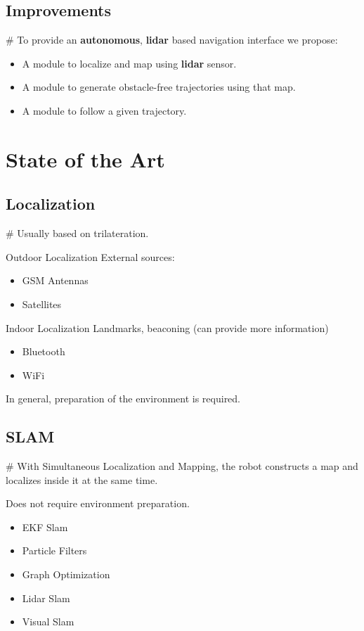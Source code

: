\documentclass[]{beamer}
\def\mAlertSpace{\vspace{0.5em}}
\def\mOrangeItem{\item[\textcolor{orange}{\textbullet}]}
\newcommand{\mSlideTitle}{{{\color{gray}\secname}} \# \subsecname}
\begin{document}
\subsection{Improvements}
\begin{frame}{\mSlideTitle}
  To provide an \textbf{autonomous}, \textbf{lidar} based navigation interface we propose:
  \begin{itemize}
    \mOrangeItem A module to localize and map using \textbf{lidar} sensor.
    \mOrangeItem A module to generate obstacle-free trajectories using that map.
    \mOrangeItem A module to follow a given trajectory.
  \end{itemize}
\end{frame}

\section{State of the Art}
\subsection{Localization}
\begin{frame}{\mSlideTitle}
  Usually based on trilateration.
  \begin{alertblock}{Outdoor Localization}
    \mAlertSpace%
    External sources:
    \begin{itemize}
      \item GSM Antennas
      \item Satellites
    \end{itemize}
  \end{alertblock}
  \begin{alertblock}{Indoor Localization}
    \mAlertSpace%
    Landmarks, beaconing (can provide more information)
    \begin{itemize}
      \item Bluetooth
      \item WiFi
    \end{itemize}
  \end{alertblock}
  In general, preparation of the environment is required.
\end{frame}


\subsection{SLAM}
\begin{frame}{\mSlideTitle}
  With \alert{S}imultaneous \alert{L}ocalization \alert{a}nd \alert{M}apping, the robot constructs a map and localizes inside it at the same time.

  Does not require environment preparation.
  \begin{itemize}
    \mOrangeItem EKF Slam
    \mOrangeItem Particle Filters
    \mOrangeItem Graph Optimization
    \mOrangeItem \alert{Lidar Slam}
    \mOrangeItem Visual Slam
  \end{itemize}
\end{frame}
\end{document}
